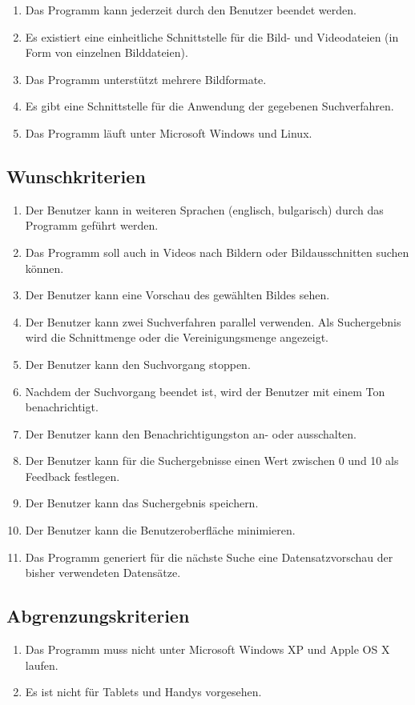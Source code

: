 \begin{enumerate} [label=\bfseries /MK \arabic*0/]
\item Das Programm kann jederzeit durch den Benutzer beendet werden.
\item Es existiert eine einheitliche Schnittstelle für die Bild- und Videodateien (in Form von einzelnen Bilddateien).
\item Das Programm unterstützt mehrere Bildformate.
\item Es gibt eine Schnittstelle für die Anwendung der gegebenen Suchverfahren.
\item Das Programm läuft unter Microsoft Windows und Linux.
\end{enumerate}
\subsection{Wunschkriterien}
\begin{enumerate} [label=\bfseries /WK \arabic*0/]
\item Der Benutzer kann in weiteren Sprachen (englisch, bulgarisch) durch das Programm geführt werden.
\item Das Programm soll auch in Videos nach Bildern oder Bildausschnitten suchen können.
\item Der Benutzer kann eine Vorschau des gewählten Bildes sehen.
\item Der Benutzer kann zwei Suchverfahren parallel verwenden. Als Suchergebnis wird die Schnittmenge oder die Vereinigungsmenge angezeigt.
\item Der Benutzer kann den Suchvorgang stoppen.
\item Nachdem der Suchvorgang beendet ist, wird der Benutzer mit einem Ton benachrichtigt.
\item Der Benutzer kann den Benachrichtigungston an- oder ausschalten.
\item Der Benutzer kann für die Suchergebnisse einen Wert zwischen 0 und 10 als Feedback festlegen.
\item Der Benutzer kann das Suchergebnis speichern.
\item Der Benutzer kann die Benutzeroberfläche minimieren.
\item Das Programm generiert für die nächste Suche eine Datensatzvorschau der bisher verwendeten Datensätze.  
\end{enumerate}
\subsection{Abgrenzungskriterien}
\begin{enumerate} [label=\bfseries /AK \arabic*0/]
\item Das Programm muss nicht unter Microsoft Windows XP und Apple OS X laufen. 
\item Es ist nicht für Tablets und Handys vorgesehen.
\end{enumerate}
